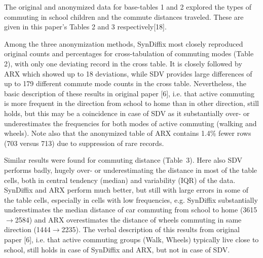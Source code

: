 \documentclass[10pt]{article}
\newcommand{\mycite}[1]{[#1]}
\begin{document}
      \setlength{\fboxsep}{3pt}


The original and anonymized data for base-tables 1 and 2 explored the types of commuting in school children and the commute distances traveled. These are given in this paper's Tables 2 and 3 respectively\mycite{18}. 

Among the three anonymization methods, SynDiffix most closely reproduced original counts and percentages for cross-tabulation of commuting modes (Table 2), with only one deviating record in the cross table. It is closely followed by ARX which showed up to 18 deviations, while SDV provides large differences of up to 179 different commute mode counts in the cross table. Nevertheless, the basic description of these results in original paper \mycite{6}, i.e. that active commuting is more frequent in the direction from school to home than in other direction, still holds, but this may be a coincidence in case of SDV as it substantially over- or underestimates the frequencies for both modes of active commuting (walking and wheels). Note also that the anonymized table of ARX contains 1.4\% fewer rows (703 versus 713) due to suppression of rare records.

Similar results were found for commuting distance (Table~3). Here also SDV performs badly, hugely over- or underestimating the distance in most of the table cells, both in central tendency (median) and variability (IQR) of the data. SynDiffix and ARX perform much better, but still with large errors in some of the table cells, especially in cells with low frequencies, e.g. SynDiffix substantially underestimates the median distance of car commuting from school to home (3615$\rightarrow$2584) and ARX overestimates the distance of wheels commuting in same direction (1444$\rightarrow$2235). The verbal description of this results from original paper \mycite{6}, i.e. that active commuting groups (Walk, Wheels) typically live
close to school, still holds in case of SynDiffix and ARX, but not in case of SDV.

%
%
%
\end{document}
